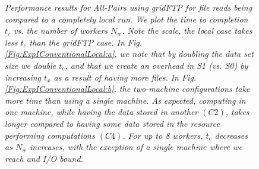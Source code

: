 \documentclass{rspublic}
\begin{document}
\begin{figure}[!ht]
\begin{center}
\caption{\textit{Performance results for All-Pairs using gridFTP for
file reads being compared to a completely local run. We plot the time to
completion $t_c$ vs. the number of workers $N_w$. Note the scale, the
local case takes less $t_c$  than the gridFTP case. In Fig.
\ref{Fig:ExpIConventionalLocal:a}, we note that by doubling the data set size we double $t_c$, and that we create an overhead in S1 (vs. S0) by increasing $t_x$ as a result of having more files.  In Fig. \ref{Fig:ExpIConventionalLocal:b}, the two-machine
configurations take more time than using a single machine. As expected,
computing in one machine, while having the data stored in another
$(C2)$, takes longer compared to having some data stored in the resource
performing computations $(C4)$. For up to 8 workers, $t_c$ decreases as
$N_w$ increases, with the exception of a single machine where we reach
and I/O bound.}}
\label{Fig:ExpIConventionalLocal}
\end{center}
\end{figure}
\end{document}
